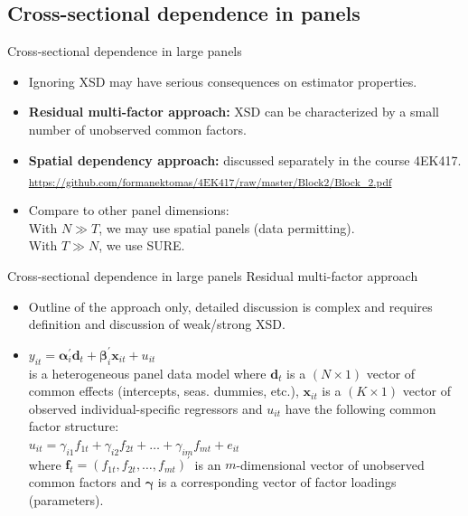 \documentclass[usenames,dvipsnames]{beamer}
\begin{document}
\subsection*{Cross-sectional dependence in panels}
\begin{frame}{Cross-sectional dependence in large panels}
    \begin{itemize}
        \item Ignoring XSD may have serious consequences on estimator properties.
        \medskip
        \item \textbf{Residual multi-factor approach:} XSD can be characterized by a small number of unobserved common factors.
        \medskip
        \item \textbf{Spatial dependency approach:} discussed separately in the course 4EK417.\\ \textsubscript{ \textcolor{Blue}{\url{https://github.com/formanektomas/4EK417/raw/master/Block2/Block_2.pdf}} }
        \bigskip
        \item Compare to other panel dimensions:\\ \smallskip 
        With $N \gg T$, we may use spatial panels (data permitting). \\
        With $T \gg N$, we use SURE.\\
    \end{itemize}
\end{frame}
\begin{frame}{Cross-sectional dependence in large panels}
Residual multi-factor approach\\ \bigskip
\footnotesize
    \begin{itemize}
        \item Outline of the approach only, detailed discussion is complex and requires definition and discussion of weak/strong XSD.\\ 
        \bigskip
        \item $y_{it}=\bm{\alpha}_i^{\prime} \bm{d}_t + \bm{\beta}_i^{\prime} \bm{x}_{it} + u_{it}$\\ \bigskip
        is a heterogeneous panel data model where $\bm{d}_t$ is a $(N\!\times\!1)$ vector of common effects (intercepts, seas. dummies, etc.), $\bm{x}_{it}$ is a $(K\!\times\!1)$ vector of observed individual-specific regressors and $u_{it}$ have the following common factor structure:\\ \bigskip
        $u_{it} = \gamma_{i1}f_{1t} + \gamma_{i2}f_{2t} + \dots + \gamma_{im}f_{mt} + e_{it}$\\
        \bigskip
        where $\bm{f}_t=(f_{1t},f_{2t},\dots,f_{mt})^{\prime}$ is an $m$-dimensional vector of unobserved common factors and $\bm{\gamma}$ is a corresponding vector of factor loadings (parameters).
    \end{itemize}
\end{frame}
\end{document}
